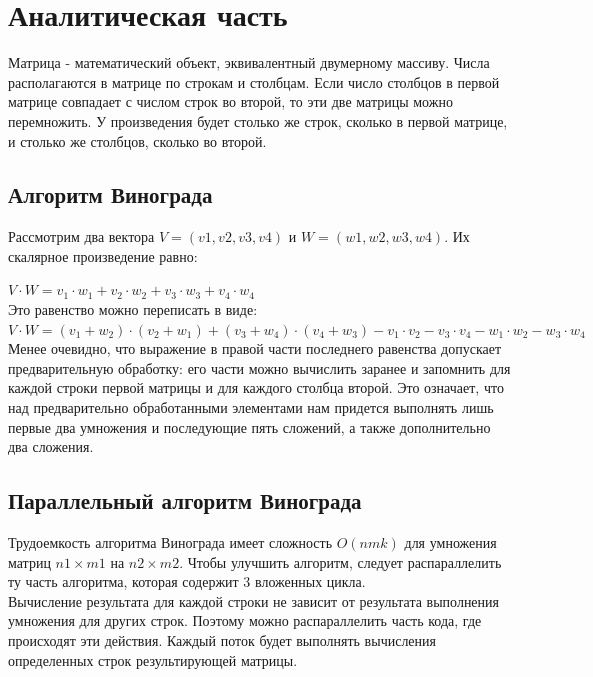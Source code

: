 \documentclass[12pt]{report}
\begin{document}
\chapter{Аналитическая часть}
Матрица - математический объект, эквивалентный двумерному массиву. Числа располагаются в матрице по строкам и столбцам. Если число столбцов в первой матрице совпадает с числом строк во второй, то эти две матрицы можно перемножить. У произведения будет столько же строк, сколько в первой матрице, и столько же столбцов, сколько во второй.


\section{Алгоритм Винограда}
Рассмотрим два вектора $V = (v1, v2, v3, v4)$ и $W = (w1, w2, w3, w4)$. Их скалярное произведение равно: 

$ V \cdot W=v_1 \cdot w_1 + v_2 \cdot w_2 + v_3 \cdot w_3 + v_4 \cdot w_4$ \\

Это равенство можно переписать в виде: \\
$V \cdot W=(v_1 + w_2) \cdot (v_2 + w_1) + (v_3 + w_4) \cdot (v_4 + w_3) - v_1 \cdot v_2 - v_3 \cdot v_4 - w_1 \cdot w_2 - w_3 \cdot w_4$\\

Менее очевидно, что выражение в правой части последнего равенства допускает предварительную обработку: его части можно вычислить заранее и запомнить для каждой строки первой матрицы и для каждого столбца второй. 
Это означает, что над предварительно обработанными элементами нам придется выполнять лишь первые два умножения и последующие пять сложений, а также дополнительно два сложения. 

\section{Параллельный алгоритм Винограда }
Трудоемкость алгоритма Винограда имеет сложность $O(nmk)$ для умножения матриц $n1 \times m1$ на $n2 \times m2$. Чтобы улучшить алгоритм, следует распараллелить ту часть алгоритма, которая содержит 3 вложенных цикла.\\

	Вычисление результата для каждой строки не зависит от результата выполнения умножения для других строк. Поэтому можно распараллелить часть кода, где происходят эти действия. Каждый поток будет выполнять вычисления определенных строк результирующей матрицы.
	
\end{document}
